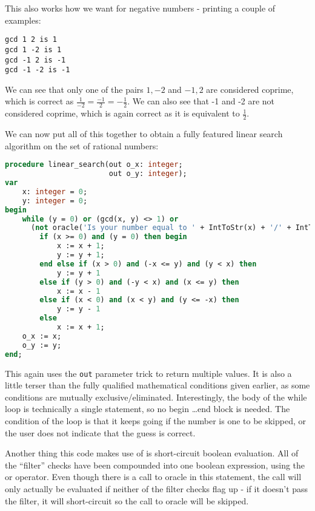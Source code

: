 \documentclass[fleqn,a4paper,11pt]{article}
\begin{document}
    This also works how we want for negative numbers - printing a couple of
    examples:

\begin{lstlisting}[caption=GCD behaviour for negative numbers]
gcd 1 2 is 1
gcd 1 -2 is 1
gcd -1 2 is -1
gcd -1 -2 is -1
\end{lstlisting}

    We can see that only one of the pairs $1, -2$ and $-1, 2$ are considered
    coprime, which is correct as $\frac{1}{-2} = \frac{-1}{2} = -\frac{1}{2}$.
    We can also see that -1 and -2 are not considered coprime, which is again
    correct as it is equivalent to $\frac{1}{2}$.

    We can now put all of this together to obtain a fully featured linear search
    algorithm on the set of rational numbers:

\begin{lstlisting}[language=Pascal, caption=Linear search on $\mathbb{Q}$ implementation in Pascal]
procedure linear_search(out o_x: integer;
                        out o_y: integer);
var
    x: integer = 0;
    y: integer = 0;
begin
    while (y = 0) or (gcd(x, y) <> 1) or
      (not oracle('Is your number equal to ' + IntToStr(x) + '/' + IntToStr(y) + '? ')) do
        if (x >= 0) and (y = 0) then begin
            x := x + 1;
            y := y + 1;
        end else if (x > 0) and (-x <= y) and (y < x) then
            y := y + 1
        else if (y > 0) and (-y < x) and (x <= y) then
            x := x - 1
        else if (x < 0) and (x < y) and (y <= -x) then
            y := y - 1
        else
            x := x + 1;
    o_x := x;
    o_y := y;
end;
\end{lstlisting}

    This again uses the \verb|out| parameter trick to return multiple values. It
    is also a little terser than the fully qualified mathematical conditions
    given earlier, as some conditions are mutually exclusive/eliminated.
    Interestingly, the body of the while loop is technically a single statement,
    so no begin \ldots end block is needed. The condition of the loop is that it
    keeps going if the number is one to be skipped, or the user does not
    indicate that the guess is correct.

    Another thing this code makes use of is short-circuit boolean evaluation.
    All of the ``filter'' checks have been compounded into one boolean
    expression, using the or operator. Even though there is a call to oracle in
    this statement, the call will only actually be evaluated if neither of the
    filter checks flag up - if it doesn't pass the filter, it will short-circuit
    so the call to oracle will be skipped.
\end{document}
